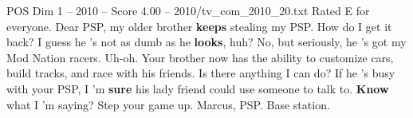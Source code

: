\begin{textsample}{POS Dim 1 – 2010 – Score 4.00 – 2010/tv\_com\_2010\_20.txt}  \label{ex:f1_pos_069}
Rated E for everyone.
Dear PSP, my older brother \textbf{keeps} stealing my PSP.
How do I get it back?
I guess he 's not as dumb as he \textbf{looks}, huh?
No, but seriously, he 's got my Mod Nation racers.
Uh-oh.
Your brother now has the ability to customize cars, build tracks, and race with his friends.
Is there anything I can do?
If he 's busy with your PSP, I 'm \textbf{sure} his lady friend could use someone to talk to. \textbf{Know} what I 'm saying?
Step your game up.
Marcus, PSP.
Base station.

\end{textsample}
